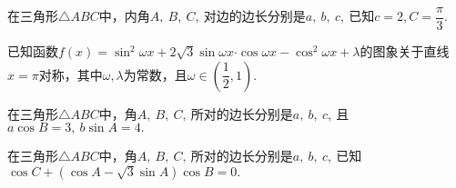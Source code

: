 \begin{questions}
\kongbai
\qs 在三角形$\triangle ABC$中，内角$ A,\ B,\ C,\  $对边的边长分别是$ a,\ b,\ c ,\ $已知$ c=2,C=\dfrac{\pi}{3} .$
\newpage
\qs 已知函数$f(x)=\sin^2 \omega x+2\sqrt{3}\sin \omega x\bm{\cdot}\cos \omega x-\cos^2 \omega x+\lambda$的图象关于直线$ x=\pi $对称，其中$ {\omega ,\lambda} $为常数，且$ \omega \in \left(\dfrac{1}{2},1\right). $
\kongbai
\qs 在三角形$\triangle ABC$中，角$A,\ B,\ C,\ $所对的边长分别是$a,\ b,\ c,\ $且$ a\cos B=3,\ b\sin A=4. $
\kongbai
\qs 在三角形$\triangle ABC$中，角$A,\ B,\ C,\ $所对的边长分别是$a,\ b,\ c,\ $已知$ \cos C+(\cos A-\sqrt{3}\sin A)\cos B=0. $
\begin{parts}

\end{parts}
\end{questions}
